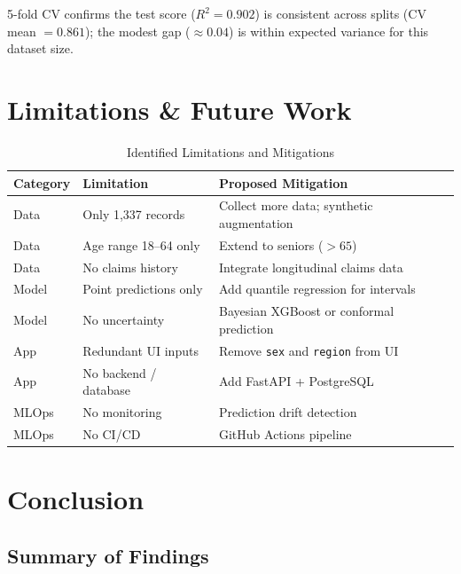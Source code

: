 \documentclass[12pt,a4paper]{report}
\begin{document}
5-fold CV confirms the test score ($R^2 = 0.902$) is consistent across splits (CV mean $= 0.861$); the modest gap ($\approx 0.04$) is within expected variance for this dataset size.

\chapter{Limitations \& Future Work}

\begin{table}[H]
\centering
\caption{Identified Limitations and Mitigations}
\begin{tabular}{p{2.8cm}p{4cm}p{5.5cm}}
\toprule
\textbf{Category} & \textbf{Limitation} & \textbf{Proposed Mitigation} \\
\midrule
Data  & Only 1,337 records         & Collect more data; synthetic augmentation \\
Data  & Age range 18--64 only      & Extend to seniors ($>65$) \\
Data  & No claims history          & Integrate longitudinal claims data \\
Model & Point predictions only     & Add quantile regression for intervals \\
Model & No uncertainty             & Bayesian XGBoost or conformal prediction \\
App   & Redundant UI inputs        & Remove \texttt{sex} and \texttt{region} from UI \\
App   & No backend / database      & Add FastAPI + PostgreSQL \\
MLOps & No monitoring              & Prediction drift detection \\
MLOps & No CI/CD                   & GitHub Actions pipeline \\
\bottomrule
\end{tabular}
\end{table}

\chapter{Conclusion}

\section{Summary of Findings}
\end{document}
